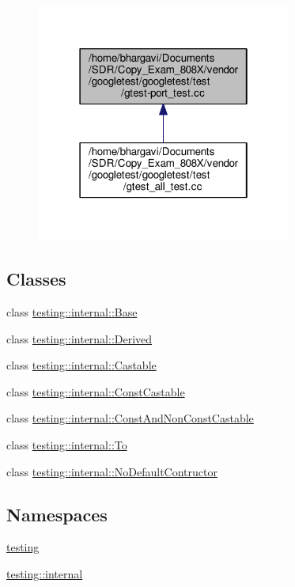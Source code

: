 \begin{figure}[H]
\begin{center}
\leavevmode
\includegraphics[width=238pt]{gtest-port__test_8cc__dep__incl}
\end{center}
\end{figure}
\subsection*{Classes}
\begin{DoxyCompactItemize}
\item 
class \hyperlink{classtesting_1_1internal_1_1_base}{testing\+::internal\+::\+Base}
\item 
class \hyperlink{classtesting_1_1internal_1_1_derived}{testing\+::internal\+::\+Derived}
\item 
class \hyperlink{classtesting_1_1internal_1_1_castable}{testing\+::internal\+::\+Castable}
\item 
class \hyperlink{classtesting_1_1internal_1_1_const_castable}{testing\+::internal\+::\+Const\+Castable}
\item 
class \hyperlink{classtesting_1_1internal_1_1_const_and_non_const_castable}{testing\+::internal\+::\+Const\+And\+Non\+Const\+Castable}
\item 
class \hyperlink{classtesting_1_1internal_1_1_to}{testing\+::internal\+::\+To}
\item 
class \hyperlink{classtesting_1_1internal_1_1_no_default_contructor}{testing\+::internal\+::\+No\+Default\+Contructor}
\end{DoxyCompactItemize}
\subsection*{Namespaces}
\begin{DoxyCompactItemize}
\item 
 \hyperlink{namespacetesting}{testing}
\item 
 \hyperlink{namespacetesting_1_1internal}{testing\+::internal}
\end{DoxyCompactItemize}
